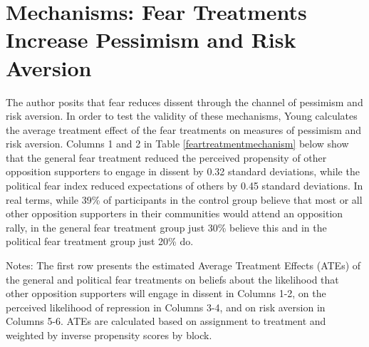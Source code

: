 \documentclass{article}
\begin{document}
\section{Mechanisms: Fear Treatments Increase Pessimism and Risk Aversion}

The author posits that fear reduces dissent through the channel of pessimism and risk aversion. In order to test the validity of these mechanisms, Young calculates the average treatment effect of the fear treatments on measures of pessimism and risk aversion. Columns 1 and 2 in Table \ref{feartreatmentmechanism} below show that the general fear treatment reduced the perceived propensity of other opposition supporters to engage in dissent by 0.32 standard deviations, while the political fear index reduced expectations of others by 0.45 standard deviations.  In real terms, while 39\% of participants in the control group believe that most or all other opposition supporters in their communities would attend an opposition rally, in the general fear treatment group just 30\% believe this and in the political fear treatment group just 20\% do.
\\



\begin{table}[!htbp] \centering 
  \caption{The Fear Treatments Increase Pessimism and Risk Aversion} 
  \label{feartreatmentmechanism} 
\begin{tablenotes}
      \small
\item Notes: The first row presents the estimated Average Treatment Effects (ATEs) of the general and political fear treatments on beliefs about the likelihood that other opposition supporters will engage in dissent in Columns 1-2, on the perceived likelihood of repression in Columns 3-4, and on risk aversion in Columns 5-6. ATEs are calculated based on assignment to treatment and weighted by inverse propensity scores by block.
\end{tablenotes}
\end{table} 
\end{document}
